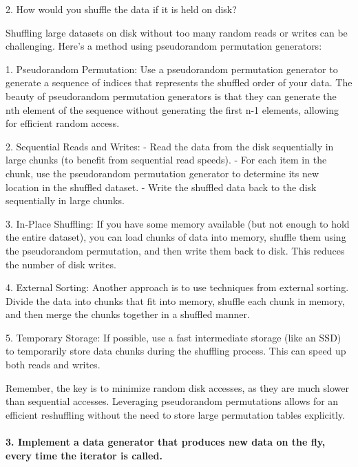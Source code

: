 2. How would you shuffle the data if it is held on disk?

Shuffling large datasets on disk without too many random reads or writes can be challenging. Here's a method using pseudorandom permutation generators:

1. Pseudorandom Permutation: Use a pseudorandom permutation generator to generate a sequence of indices that represents the shuffled order of your data.
The beauty of pseudorandom permutation generators is that they can generate the nth element of the sequence without generating the first n-1 elements, allowing for efficient random access.

2. Sequential Reads and Writes:
- Read the data from the disk sequentially in large chunks (to benefit from sequential read speeds).
- For each item in the chunk, use the pseudorandom permutation generator to determine its new location in the shuffled dataset.
- Write the shuffled data back to the disk sequentially in large chunks.

3. In-Place Shuffling: If you have some memory available (but not enough to hold the entire dataset), you can load chunks of data into memory, shuffle them using the pseudorandom permutation, and then write them back to disk.
This reduces the number of disk writes.

4. External Sorting: Another approach is to use techniques from external sorting.
Divide the data into chunks that fit into memory, shuffle each chunk in memory, and then merge the chunks together in a shuffled manner.

5. Temporary Storage: If possible, use a fast intermediate storage (like an SSD) to temporarily store data chunks during the shuffling process.
This can speed up both reads and writes.

Remember, the key is to minimize random disk accesses, as they are much slower than sequential accesses.
Leveraging pseudorandom permutations allows for an efficient reshuffling without the need to store large permutation tables explicitly.


\paragraph{3. Implement a data generator that produces new data on the fly, every time the iterator is called.}

